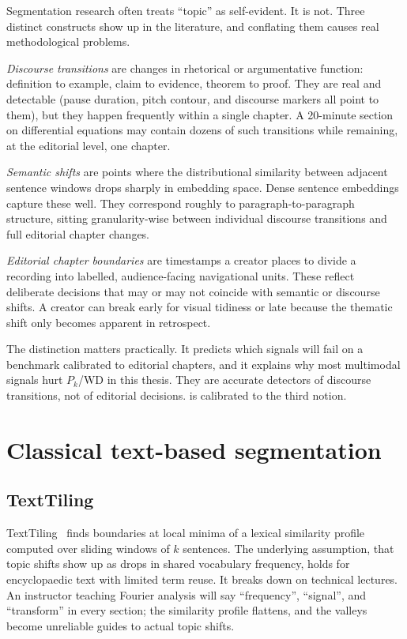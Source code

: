 Segmentation research often treats ``topic'' as self-evident. It is not.
Three distinct constructs show up in the literature, and conflating them
causes real methodological problems.

\emph{Discourse transitions} are changes in rhetorical or argumentative
function: definition to example, claim to evidence, theorem to proof. They
are real and detectable (pause duration, pitch contour, and discourse markers
all point to them), but they happen frequently within a single chapter. A
20-minute section on differential equations may contain dozens of such
transitions while remaining, at the editorial level, one chapter.

\emph{Semantic shifts} are points where the distributional similarity between
adjacent sentence windows drops sharply in embedding space. Dense sentence
embeddings capture these well. They correspond roughly to paragraph-to-paragraph
structure, sitting granularity-wise between individual discourse transitions
and full editorial chapter changes.

\emph{Editorial chapter boundaries} are timestamps a creator places to divide
a recording into labelled, audience-facing navigational units. These reflect
deliberate decisions that may or may not coincide with semantic or discourse
shifts. A creator can break early for visual tidiness or late because the
thematic shift only becomes apparent in retrospect.

The distinction matters practically. It predicts which signals will fail on
a benchmark calibrated to editorial chapters, and it explains why most
multimodal signals hurt $P_k$/WD in this thesis. They are accurate detectors
of discourse transitions, not of editorial decisions.
\lecseg{} is calibrated to the third notion.

\section{Classical text-based segmentation}
\label{sec:classical}

\subsection{TextTiling}

TextTiling~\cite{hearst1994multi} finds boundaries at local minima of a
lexical similarity profile computed over sliding windows of $k$ sentences.
The underlying assumption, that topic shifts show up as drops in shared
vocabulary frequency, holds for encyclopaedic text with limited term reuse.
It breaks down on technical lectures. An instructor teaching Fourier analysis
will say ``frequency'', ``signal'', and ``transform'' in every section; the
similarity profile flattens, and the valleys become unreliable guides to
actual topic shifts.

